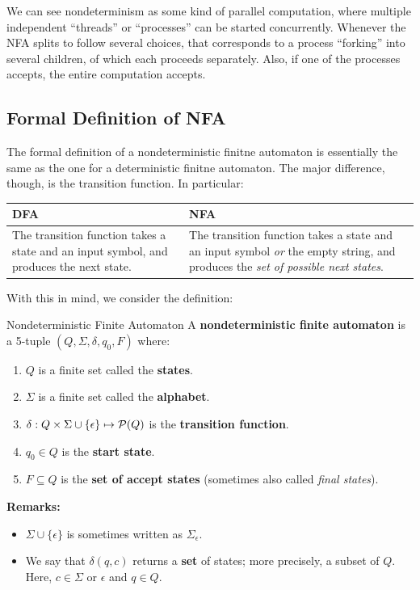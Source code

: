 \documentclass[letterpaper]{article}
\begin{document}
We can see nondeterminism as some kind of parallel computation, where multiple independent ``threads'' or ``processes'' can be started concurrently. Whenever the NFA splits to follow several choices, that corresponds to a process ``forking'' into several children, of which each proceeds separately. Also, if one of the processes accepts, the entire computation accepts. 


\subsection{Formal Definition of NFA}
The formal definition of a nondeterministic finitne automaton is essentially the same as the one for a deterministic finitne automaton. The major difference, though, is the transition function. In particular:
\begin{center}
    \begin{tabular}{p{3in}|p{3in}}
        \textbf{DFA} & \textbf{NFA} \\ 
        \hline 
        The transition function takes a state and an input symbol, and produces the next state. & The transition function takes a state and an input symbol \emph{or} the empty string, and produces the \emph{set of possible next states}.
    \end{tabular}
\end{center}

With this in mind, we consider the definition:
\begin{definition}{Nondeterministic Finite Automaton}{}
    A \textbf{nondeterministic finite automaton} is a 5-tuple $(Q, \Sigma, \delta, q_0, F)$ where: 
    \begin{enumerate}
        \item $Q$ is a finite set called the \textbf{states}.
        \item $\Sigma$ is a finite set called the \textbf{alphabet}.
        \item $\delta: Q \times \Sigma \cup \{\epsilon\} \mapsto \mathcal{P}(Q)$ is the \textbf{transition function}.
        \item $q_0 \in Q$ is the \textbf{start state}.
        \item $F \subseteq Q$ is the \textbf{set of accept states} (sometimes also called \emph{final states}).
    \end{enumerate}
\end{definition}
\textbf{Remarks:}
\begin{itemize}
    \item $\Sigma \cup \{\epsilon\}$ is sometimes written as $\Sigma_{\epsilon}$.
    \item We say that $\delta(q, c)$ returns a \textbf{set} of states; more precisely, a subset of $Q$. Here, $c \in \Sigma$ or $\epsilon$ and $q \in Q$.
\end{itemize}
\end{document}
